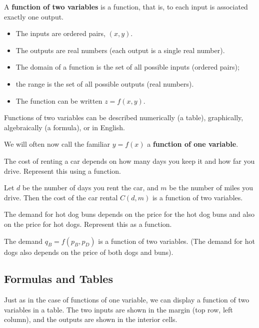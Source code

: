 \begin{definition}
A {\bf function of two variables} is a function, that is, to each input is associated exactly one output.
    \begin{itemize}
    \item The inputs are ordered pairs, $(x,y)$. 
    \item The outputs are real numbers (each output is a single real number). 
    \item The domain of a function is the set of all possible inputs (ordered pairs); 
    \item the range is the set of all possible outputs (real numbers).
    \item The function can be written $z=f(x,y)$.
    \end{itemize}
Functions of two variables can be described numerically (a table), graphically, algebraically (a formula), or in English.
\end{definition}
We will often now call the familiar $y=f(x)$ a {\bf function of one variable}.

\begin{example}
The cost of renting a car depends on how many days you keep it and how far you drive. Represent this using a function.

\begin{solution} Let $d$ be the number of days you rent the car, and $m$ be the number of miles you drive. Then the cost of the car rental $C(d,m)$ is a function of two variables.
\end{solution}\end{example}

\begin{example}
The demand for hot dog buns depends on the price for the hot dog buns and also on the price for hot dogs. Represent this as a function.

\begin{solution} The demand $q_B=f(p_B,p_D)$ is a function of two variables. (The demand for hot dogs also depends on the price of both dogs and buns).
\end{solution}\end{example}

\subsection{Formulas and Tables}
Just as in the case of functions of one variable, we can display a function of two variables in a table. The two inputs are shown in the margin (top row, left column), and the outputs are shown in the interior cells.

